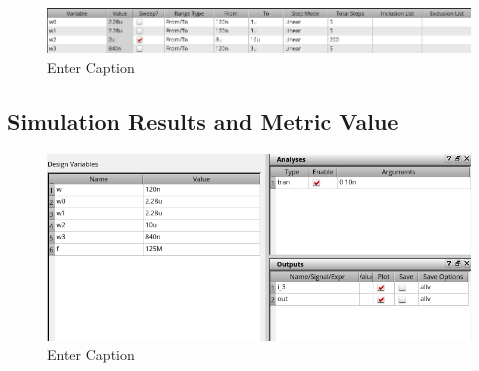 \documentclass[12pt]{article}
\begin{document}
\begin{figure}[H]
    \centering
    \includegraphics[width=0.5\linewidth]{writeup//figures/wmux_1_parametric_sweep_setup.png}
    \caption{Enter Caption}
\end{figure}




\newpage

\subsection{Simulation Results and Metric Value}

\begin{figure}[H]
    \centering
    \includegraphics[width=\linewidth]{writeup//figures/optimized_delay_ADEL_setup.png}
    \caption{Enter Caption}
\end{figure}
\end{document}
